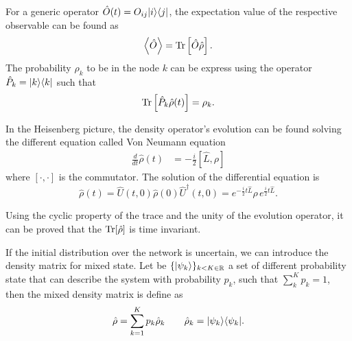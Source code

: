 For a generic operator $\hat O(t) = O_{ij}\lvert i\rangle\langle j\rvert$, the expectation value of the respective observable can be found as \cite{Nielsen_Chuang_2010}
\begin{equation}
        \left< \hat O\right> = \operatorname{Tr}\left[\hat O\hat\rho\right].
\end{equation}
The probability $\rho_k$ to be in the node $k$ can be express using the operator $\hat P_k = \lvert k\rangle\langle k\rvert$ such that
\begin{equation} \label{state_projection_quantum}
    \begin{split}
        \operatorname{Tr}\left[\hat P_k\hat\rho(t)\right] 
        = \rho_k.
    \end{split}
\end{equation}

In the Heisenberg picture, the density operator's evolution can be found solving the different equation called Von Neumann equation
\begin{equation}\label{Von Neumann equation}
    \begin{split}
        \frac{d}{dt}\hat\rho(t) 
        &= -\frac{i}{2}\left[\hat L,\rho\right]
    \end{split}
\end{equation}
where $[\cdot,\cdot]$ is the commutator.
The solution of the differential equation is
\begin{equation}
    \hat\rho(t) = \hat U(t,0)\hat\rho(0)\hat U^\dagger(t,0) = e^{-\frac{i}{2}t\hat L}\hat\rho\, e^{\frac{i}{2}t\hat L}.
\end{equation}

Using the cyclic property of the trace and the unity of the evolution operator, it can be proved that the $\operatorname{Tr}[\hat\rho]$ is time invariant.

If the initial distribution over the network is uncertain, we can introduce the density matrix for mixed state. Let be $\{\lvert\psi_k\rangle\}_{k<K\in\mathbb{R}}$ a set of different probability state that can describe the system with probability $p_k$, such that $\sum_k^K p_k = 1$, then the mixed density matrix is define as
\begin{equation}
    \hat \rho = \sum_{k=1}^K p_k \hat \rho_k \qquad \hat\rho_k = \lvert\psi_k\rangle\langle\psi_k\rvert.
\end{equation}

